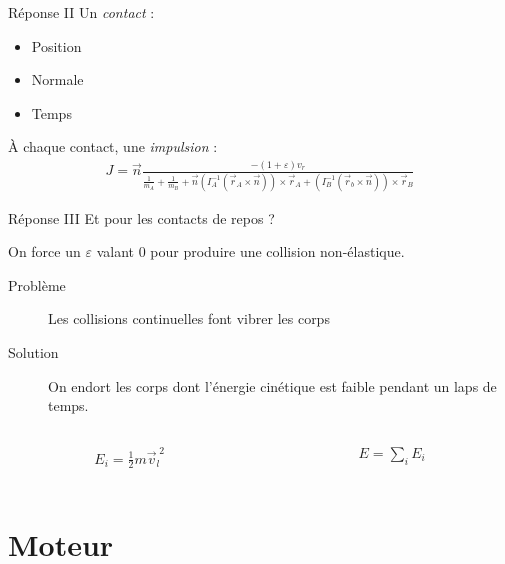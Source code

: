 \documentclass{beamer}
\begin{document}
\begin{frame}{Réponse II}
  Un \textit{contact} :
  \begin{itemize}
  \item Position
  \item Normale
  \item Temps
  \end{itemize}

  \vfill

  \`A chaque contact, une \textit{impulsion} :
  \begin{align*}
    J = \vec{n} 
    \frac{-(1 + \varepsilon) v_r}{
      \frac{1}{m_A} +
      \frac{1}{m_B} +
      \vec{n}
      (I_A^{-1} (\vec{r}_A \times \vec{n})) \times \vec{r}_A +
      (I_B^{-1} (\vec{r}_b \times \vec{n})) \times \vec{r}_B
    }
  \end{align*}
\end{frame}

\begin{frame}{Réponse III}
  Et pour les contacts de repos ?

  \vfill

  On force un $\varepsilon$ valant 0 pour produire une collision non-élastique.

  \vfill

  \begin{description}
    \item[Problème] Les collisions continuelles font vibrer les corps
    \item[Solution] On endort les corps dont l'énergie cinétique est faible pendant un laps de temps.
  \end{description}
  
  \vfill

  \begin{columns}
    \begin{column}{3cm}
      \begin{align*}
        E_i = \frac{1}{2} m \vec{v}^{\;2}_l
      \end{align*}
    \end{column}
    \begin{column}{3cm}
      \begin{align*}
        E = \sum_i E_i
      \end{align*}
    \end{column}
  \end{columns}
\end{frame}

\section{Moteur}
\end{document}
